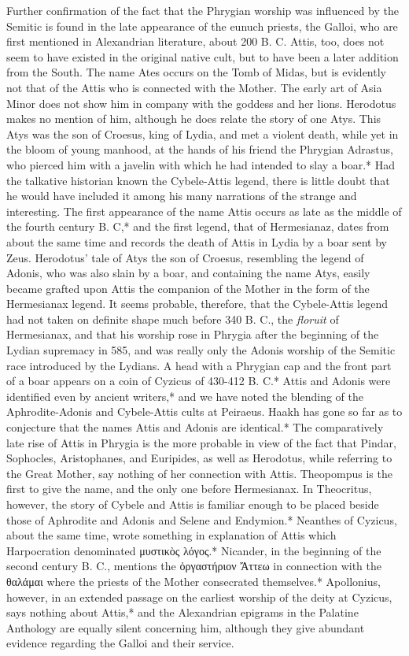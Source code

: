 \documentclass[a4paper, 11pt, oneside, polutonikogreek, english]{article}
\begin{document}
Further confirmation of the fact that the Phrygian worship was influenced by the Semitic is found in the late appearance of the eunuch priests, the Galloi, who are first mentioned in Alexandrian literature, about 200 B. C. Attis, too, does not seem to have existed in the original native cult, but to have been a later addition from the South. The name Ates occurs on the Tomb of Midas, but is evidently not that of the Attis who is connected with the Mother. The early art of Asia Minor does not show him in company with the goddess and her lions. Herodotus makes no mention of him, although he does relate the story of one Atys. This Atys was the son of Croesus, king of Lydia, and met a violent death, while yet in the bloom of young manhood, at the hands of his friend the Phrygian Adrastus, who pierced him with a javelin with which he had intended to slay a boar.* Had the talkative historian known the Cybele-Attis legend, there is little doubt that he would have included it among his many narrations of the strange and interesting. The first appearance of the name Attis occurs as late as the middle of the fourth century B. C,* and the first legend, that of Hermesianaz, dates from about the same time and records the death of Attis in Lydia by a boar sent by Zeus. Herodotus' tale of Atys the son of Croesus, resembling the legend of Adonis, who was also slain by a boar, and containing the name Atys, easily became grafted upon Attis the companion of the Mother in the form of the Hermesianax legend. It seems probable, therefore, that the Cybele-Attis legend had not taken on definite shape much before 340 B. C., the \emph{floruit} of Hermesianax, and that his worship rose in Phrygia after the beginning of the Lydian supremacy in 585, and was really only the Adonis worship of the Semitic race introduced by the Lydians. A head with a Phrygian cap and the front part of a boar appears on a coin of Cyzicus of 430-412 B. C.* Attis and Adonis were identified even by ancient writers,* and we have noted the blending of the Aphrodite-Adonis and Cybele-Attis cults at Peiraeus. Haakh has gone so far as to conjecture that the names Attis and Adonis are identical.* The comparatively late rise of Attis in Phrygia is the more probable in view of the fact that Pindar, Sophocles, Aristophanes, and Euripides, as well as Herodotus, while referring to the Great Mother, say nothing of her connection with Attis. Theopompus is the first to give the name, and the only one before Hermesianax. In Theocritus, however, the story of Cybele and Attis is familiar enough to be placed beside those of Aphrodite and Adonis and Selene and Endymion.* Neanthes of Cyzicus, about the same time, wrote something in explanation of Attis which Harpocration denominated μυστικὸς λόγος.* Nicander, in the beginning of the second century B. C., mentions the ὀργαστήριον Ἄττεω in connection with the θαλάμαι where the priests of the Mother consecrated themselves.* Apollonius, however, in an extended passage on the earliest worship of the deity at Cyzicus, says nothing about Attis,* and the Alexandrian epigrams in the Palatine Anthology are equally silent concerning him, although they give abundant evidence regarding the Galloi and their service.
\end{document}
